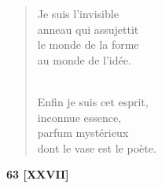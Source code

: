 \documentclass[a4paper,11pt]{book}
\begin{document}
\begin{verse}
Je suis l'invisible \\
anneau qui assujettit \\
le monde de la forme \\
au monde de l'idée. \\ \

Enfin je suis cet esprit, \\
inconnue essence, \\
parfum mystérieux \\
dont le vase est le poète. \\
\end{verse}

\bigskip

\begin{center} {\bf 63 [XXVII]} \end{center}
\end{document}
